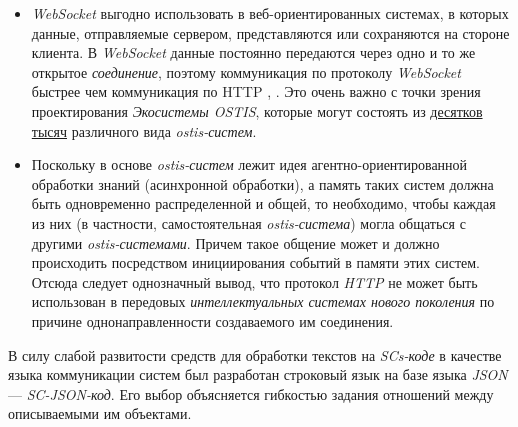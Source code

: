 \begin{SCn}
\begin{scnsubstruct}
\begin{scnsubstruct}
\begin{scnsubstruct}
\begin{scnsubstruct}
\begin{scnsubstruct}
{	\begin{itemize}
		\item \textit{WebSocket} выгодно использовать в веб-ориентированных системах, в которых данные, отправляемые сервером, представляются или сохраняются на стороне клиента. В \textit{WebSocket} данные постоянно передаются через одно и то же открытое \textit{соединение}, поэтому коммуникация по протоколу \textit{WebSocket} быстрее чем коммуникация по HTTP \cite{Tomasetti2021}, \cite{Bhumij2018}. Это очень важно с точки зрения проектирования \textit{Экосистемы OSTIS}, которые могут состоять из \uline{десятков тысяч} различного вида \textit{ostis-систем}.
		\item Поскольку в основе \textit{ostis-систем} лежит идея агентно-ориентированной обработки знаний (асинхронной обработки), а память таких систем должна быть одновременно распределенной и общей, то необходимо, чтобы каждая из них (в частности, самостоятельная \textit{ostis-система}) могла общаться с другими \textit{ostis-системами}. Причем такое общение может и должно происходить посредством инициирования событий в памяти этих систем. Отсюда следует однозначный вывод, что протокол \textit{HTTP} не может быть использован в передовых \textit{интеллектуальных системах нового поколения} по причине однонаправленности создаваемого им соединения.
	\end{itemize}
	
	В силу слабой развитости средств для обработки текстов на \textit{SCs-коде} в качестве языка коммуникации систем был разработан строковый язык на базе языка \textit{JSON}  --- \textit{SC-JSON-код}. Его выбор объясняется гибкостью задания отношений между описываемыми им объектами.}


\end{scnsubstruct}
\end{scnsubstruct}
\end{scnsubstruct}
\end{scnsubstruct}
\end{scnsubstruct}
\end{SCn}
